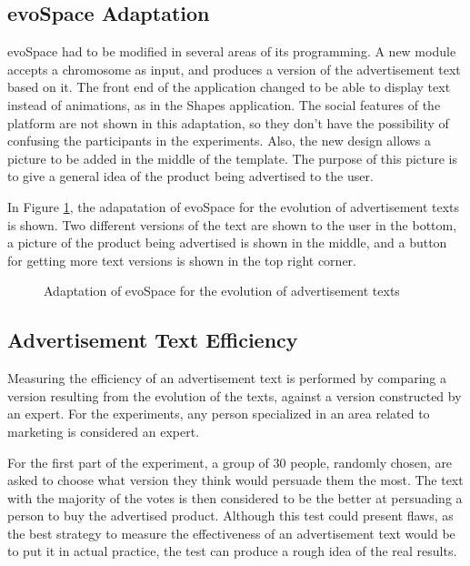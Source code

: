 \documentclass{acm_proc_article-sp}
\begin{document}
\subsection{evoSpace Adaptation}
\label{EvoSpaceAdaptation}

evoSpace had to be modified in several areas of its programming. A new
module accepts a chromosome as input, and produces a version of the
advertisement text based on it. The front end of the application
changed to be able to display text instead of animations, as in the
Shapes application. The social features of the platform are not shown
in this adaptation, so they don't have the possibility of confusing
the participants in the experiments. Also, the new design allows a
picture to be added in the middle of the template. The purpose of this
picture is to give a general idea of the product being advertised to
the user.

In Figure \ref{PicText}, the adapatation of evoSpace for the evolution
of advertisement texts is shown. Two different versions of the text
are shown to the user in the bottom, a picture of the product being
advertised is shown in the middle, and a button for getting more text
versions is shown in the top right corner.

\begin{figure}
  \centering
  \caption{Adaptation of evoSpace for the evolution of advertisement texts}
  \label{PicText}
\end{figure}

\subsection{Advertisement Text Efficiency}
\label{TextEfficiency}

Measuring the efficiency of an advertisement text is performed by
comparing a version resulting from the evolution of the texts, against
a version constructed by an expert. For the experiments, any person
specialized in an area related to marketing is considered an expert.

For the first part of the experiment, a group of 30 people, randomly
chosen, are asked to choose what version they think would persuade
them the most. The text with the majority of the votes is then
considered to be the better at persuading a person to buy the
advertised product. Although this test could present flaws, as
the best strategy to measure the effectiveness of an advertisement
text would be to put it in actual practice, the test can produce a
rough idea of the real results.
\end{document}
